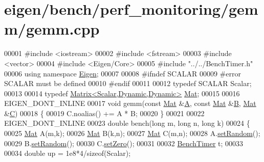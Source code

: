 \hypertarget{eigen_2bench_2perf__monitoring_2gemm_2gemm_8cpp_source}{}\section{eigen/bench/perf\+\_\+monitoring/gemm/gemm.cpp}
\label{eigen_2bench_2perf__monitoring_2gemm_2gemm_8cpp_source}

\begin{DoxyCode}
00001 \textcolor{preprocessor}{#include <iostream>}
00002 \textcolor{preprocessor}{#include <fstream>}
00003 \textcolor{preprocessor}{#include <vector>}
00004 \textcolor{preprocessor}{#include <Eigen/Core>}
00005 \textcolor{preprocessor}{#include "../../BenchTimer.h"}
00006 \textcolor{keyword}{using namespace }\hyperlink{namespace_eigen}{Eigen};
00007 
00008 \textcolor{preprocessor}{#ifndef SCALAR}
00009 \textcolor{preprocessor}{#error SCALAR must be defined}
00010 \textcolor{preprocessor}{#endif}
00011 
00012 \textcolor{keyword}{typedef} SCALAR Scalar;
00013 
00014 \textcolor{keyword}{typedef} \hyperlink{group___core___module}{Matrix<Scalar,Dynamic,Dynamic>} \hyperlink{group___core___module_class_eigen_1_1_matrix}{Mat};
00015 
00016 EIGEN\_DONT\_INLINE
00017 \textcolor{keywordtype}{void} gemm(\textcolor{keyword}{const} \hyperlink{group___core___module_class_eigen_1_1_matrix}{Mat} &\hyperlink{group___core___module_class_eigen_1_1_matrix}{A}, \textcolor{keyword}{const} \hyperlink{group___core___module_class_eigen_1_1_matrix}{Mat} &\hyperlink{group___core___module_class_eigen_1_1_matrix}{B}, \hyperlink{group___core___module_class_eigen_1_1_matrix}{Mat} &\hyperlink{group___core___module}{C})
00018 \{
00019   C.noalias() += A * B;
00020 \}
00021 
00022 EIGEN\_DONT\_INLINE
00023 \textcolor{keywordtype}{double} bench(\textcolor{keywordtype}{long} m, \textcolor{keywordtype}{long} n, \textcolor{keywordtype}{long} k)
00024 \{
00025   \hyperlink{group___core___module_class_eigen_1_1_matrix}{Mat} A(m,k);
00026   \hyperlink{group___core___module_class_eigen_1_1_matrix}{Mat} B(k,n);
00027   \hyperlink{group___core___module_class_eigen_1_1_matrix}{Mat} C(m,n);
00028   A.\hyperlink{class_eigen_1_1_plain_object_base_af0e576a0e1aefc9ee346de44cc352ba3}{setRandom}();
00029   B.\hyperlink{class_eigen_1_1_plain_object_base_af0e576a0e1aefc9ee346de44cc352ba3}{setRandom}();
00030   C.\hyperlink{class_eigen_1_1_plain_object_base_ac21ad5f989f320e46958b75ac8d9a1da}{setZero}();
00031   
00032   \hyperlink{class_eigen_1_1_bench_timer}{BenchTimer} t;
00033   
00034   \textcolor{keywordtype}{double} up = 1e8*4/\textcolor{keyword}{sizeof}(Scalar);

\end{DoxyCode}
